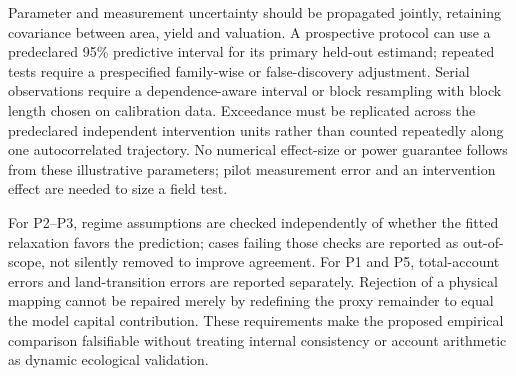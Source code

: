\documentclass[11pt,a4paper]{article}
\begin{document}
Parameter and measurement uncertainty should be propagated jointly, retaining covariance between area, yield and valuation. A prospective protocol can use a predeclared 95\% predictive interval for its primary held-out estimand; repeated tests require a prespecified family-wise or false-discovery adjustment. Serial observations require a dependence-aware interval or block resampling with block length chosen on calibration data. Exceedance must be replicated across the predeclared independent intervention units rather than counted repeatedly along one autocorrelated trajectory. No numerical effect-size or power guarantee follows from these illustrative parameters; pilot measurement error and an intervention effect are needed to size a field test.

For P2--P3, regime assumptions are checked independently of whether the fitted relaxation favors the prediction; cases failing those checks are reported as out-of-scope, not silently removed to improve agreement. For P1 and P5, total-account errors and land-transition errors are reported separately. Rejection of a physical mapping cannot be repaired merely by redefining the proxy remainder to equal the model capital contribution. These requirements make the proposed empirical comparison falsifiable without treating internal consistency or account arithmetic as dynamic ecological validation.
\end{document}
